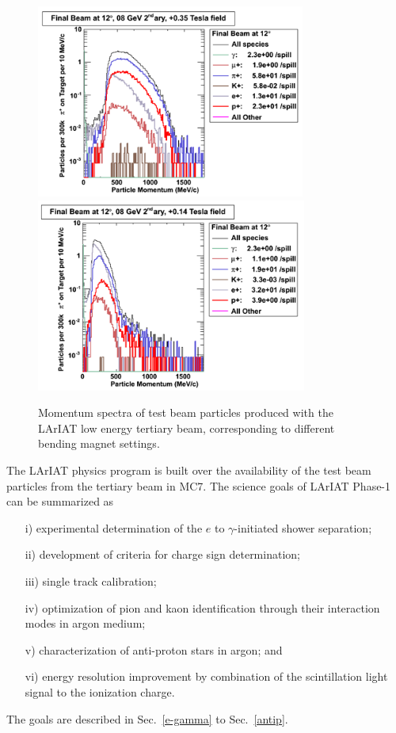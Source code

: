 \documentclass[DIV=calc, paper=a4, fontsize=10pt, twocolumn]{scrartcl}	 %
\begin{document}
{%
\begin{figure}[!h]
\begin{centering}
\vspace{-0.5cm}
\includegraphics[height=2.5in]{Figures/beam-simu1}
\includegraphics[height=2.5in]{Figures/beam-simu2}
\vspace{-0.5cm}
\caption{
{\scriptsize \sf Momentum spectra of test beam particles produced with the LArIAT low energy tertiary beam, corresponding to different bending magnet settings.}
}
\label{fig:mom-spectra-beam}
\end{centering}
\end{figure}

The LArIAT physics program is built over the availability of the test beam particles  from the tertiary beam in MC7.  The science goals of {\sf LArIAT} Phase-1 can be summarized as 
\begin{itemize}
\item[i)] experimental determination of the $e$ to $\gamma$-initiated shower separation;
\item[ii)] development of criteria for charge sign determination;
\item[iii)] single track calibration;
\item[iv)] optimization of pion and kaon identification through their interaction modes in argon medium;
\item[v)]  characterization of anti-proton stars in argon; and
\item[vi)] energy resolution improvement by combination of the scintillation light signal to the ionization charge.  
\end{itemize}
The goals are described in Sec.~\ref{e-gamma} to Sec.~\ref{antip}.

}
\end{document}

